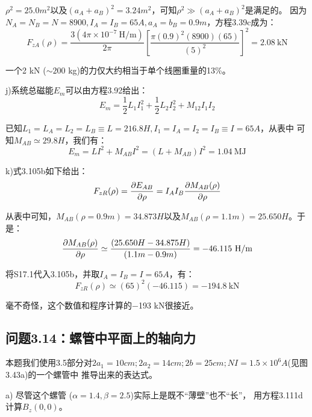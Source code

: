 $ρ^2=25.0 m^2$以及$(a_A+a_B)^2=3.24 m^2$，可知$ρ^2\gg(a_A+a_B)^2$是满足的。
因为$N_A=N_B=N =8900, I_A=I_B=65 A, a_A=b_B=0.9 m$，方程3.39c成为：
\begin{equation}
F_{zA}(\rho)=\frac{3(4\pi\times 10^{-7}\ \mathrm{H/m})}{2\pi}\left[\frac{\pi(0.9)^2(8900)(65)}{(5)^2}\right]^2=2.08\ \mathrm{kN}
\end{equation}

一个2 kN ($\sim 200$ kg)的力仅大约相当于单个线圈重量的13\%。

j)系统总磁能$E_m$可以由方程3.92给出：
\begin{equation}
E_{m}=\frac{1}{2}L_{1}I_{1}^{2}+\frac{1}{2}L_{2}I_{2}^{2}+M_{12}I_{1}I_{2}%
\end{equation}

已知$L_1 = L_A = L_2 = L_B\equiv  L = 216.8 H, I_1 = I_A = I_2 = I_B\equiv I = 65 A$，从表中
可知$M_{AB}\simeq 29.8 H$，我们有：
\begin{equation*}
	E_m=LI^2+M_{AB}I^2=(L+M_{AB})I^2=1.04\ \mathrm{MJ}
\end{equation*}

k)式3.105b如下给出：
\begin{equation}
F_{zR}(\rho)=\frac{\partial E_{AB}}{\partial \rho}=I_{A}I_{B}\frac{\partial M_{AB}(\rho)}{\partial\rho}\\%
\end{equation}

从表中可知，$M_{AB}(\rho=0.9 m)=34.873 H$以及$M_{AB}(\rho=1.1 m)=25.650 H$。于是：
\begin{equation}
\frac{\partial M_{AB}(\rho)}{\partial\rho}\simeq\frac{(25.650H-34.875H)}{(1.1m-0.9m)}=-46.115\ \mathrm{H/m}\\%
\end{equation}

将S17.1代入3.105b，并取$I_A=I_B=I =65 A$，有：
\begin{equation*}
F_{zR}(\rho)\simeq (65)^2(-46.115)=-194.8\ \mathrm{kN}
\end{equation*}

毫不奇怪，这个数值和程序计算的−193 kN很接近。
\newpage

\subsection{问题3.14：螺管中平面上的轴向力}
本题我们使用3.5部分对$2a_1 = 10 cm; 2a_2 = 14 cm; 2b = 25 cm; NI = 1.5×10^6 A$(见图3.43a)的一个螺管中
推导出来的表达式。

a) 尽管这个螺管 ($\alpha = 1.4,\beta = 2.5$)实际上是既不“薄壁”也不“长”，
用方程3.111d计算$B_z(0, 0)$。

